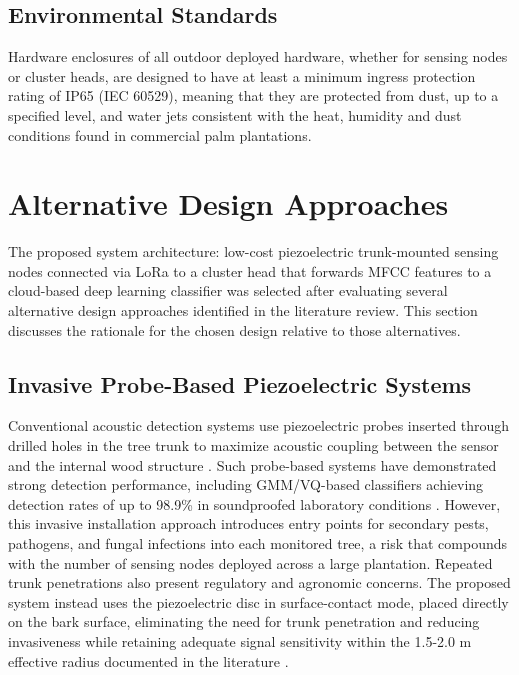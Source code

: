 \documentclass[12pt,a4paper,oneside]{memoir}
\begin{document}
\subsection{Environmental Standards}

Hardware enclosures of all outdoor deployed hardware, whether for sensing nodes or cluster heads, are designed to have at least a minimum ingress protection rating of IP65 (IEC 60529), meaning that they are protected from dust, up to a specified level, and water jets consistent with the heat, humidity and dust conditions found in commercial palm plantations.

\section{Alternative Design Approaches}

The proposed system architecture: low-cost piezoelectric trunk-mounted sensing nodes connected via LoRa to a cluster head that forwards MFCC features to a cloud-based deep learning classifier was selected after evaluating several alternative design approaches identified in the literature review. This section discusses the rationale for the chosen design relative to those alternatives.

\subsection{Invasive Probe-Based Piezoelectric Systems}

Conventional acoustic detection systems use piezoelectric probes inserted through drilled holes in the tree trunk to maximize acoustic coupling between the sensor and the internal wood structure \cite{pinhas2008,karar2022}. Such probe-based systems have demonstrated strong detection performance, including GMM/VQ-based classifiers achieving detection rates of up to 98.9\% in soundproofed laboratory conditions \cite{pinhas2008}. However, this invasive installation approach introduces entry points for secondary pests, pathogens, and fungal infections into each monitored tree, a risk that compounds with the number of sensing nodes deployed across a large plantation. Repeated trunk penetrations also present regulatory and agronomic concerns. The proposed system instead uses the piezoelectric disc in surface-contact mode, placed directly on the bark surface, eliminating the need for trunk penetration and reducing invasiveness while retaining adequate signal sensitivity within the 1.5-2.0 m effective radius documented in the literature \cite{pinhas2008,karar2022}.
\end{document}
